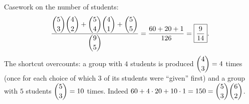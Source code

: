 Casework on the number of students:
\[\dfrac{\dbinom53\dbinom42+\dbinom54\dbinom41+\dbinom55}{\dbinom95}=\dfrac{60+20+1}{126}=\boxed{\dfrac{9}{14}}.\]
The shortcut overcounts: a group with $4$ students is produced $\dbinom43=4$ times (once for each choice of which $3$ of its students were ``given'' first) and a group with $5$ students $\dbinom53=10$ times. Indeed $60+4\cdot20+10\cdot1=150=\dbinom53\dbinom62$.
